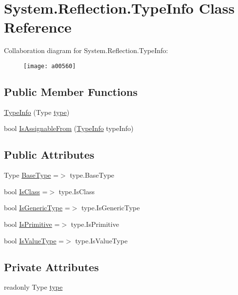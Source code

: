 \hypertarget{a00159}{\section{System.\-Reflection.\-Type\-Info Class Reference}
\label{a00159}
}


Collaboration diagram for System.\-Reflection.\-Type\-Info\-:
\nopagebreak
\begin{figure}[H]
\begin{center}
\leavevmode
\texttt{[image: a00560]}
\end{center}
\end{figure}
\subsection*{Public Member Functions}
\begin{DoxyCompactItemize}
\item 
\hyperlink{a00159_ae2bbf4462c274977b6df5c994808cc39}{Type\-Info} (Type \hyperlink{a00159_a71c4f4b000d08808c8965222d4ba1b8d}{type})
\item 
bool \hyperlink{a00159_a8c74647f572e998dd7e843a752d5234d}{Is\-Assignable\-From} (\hyperlink{a00159}{Type\-Info} type\-Info)
\end{DoxyCompactItemize}
\subsection*{Public Attributes}
\begin{DoxyCompactItemize}
\item 
Type \hyperlink{a00159_a8bb78c2b0377f57dba1a3e2031216029}{Base\-Type} =$>$ type.\-Base\-Type
\item 
bool \hyperlink{a00159_a6ae2d0f4c557010a075a6fecab18fbb5}{Is\-Class} =$>$ type.\-Is\-Class
\item 
bool \hyperlink{a00159_a6a532f6a581b3280d1837fc242f314af}{Is\-Generic\-Type} =$>$ type.\-Is\-Generic\-Type
\item 
bool \hyperlink{a00159_ab38ba26ebc21ec6fb908b74eede99a5c}{Is\-Primitive} =$>$ type.\-Is\-Primitive
\item 
bool \hyperlink{a00159_ae2255904b8743c47a185d62909404aed}{Is\-Value\-Type} =$>$ type.\-Is\-Value\-Type
\end{DoxyCompactItemize}
\subsection*{Private Attributes}
\begin{DoxyCompactItemize}
\item 
readonly Type \hyperlink{a00159_a71c4f4b000d08808c8965222d4ba1b8d}{type}
\end{DoxyCompactItemize}



